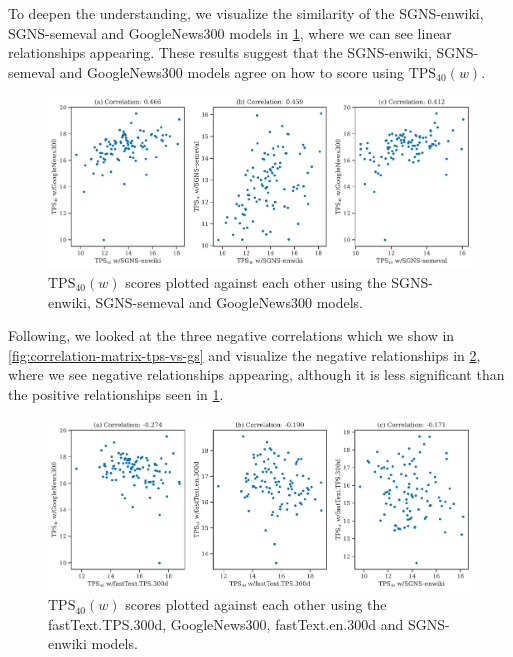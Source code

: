 To deepen the understanding, we visualize the similarity of the SGNS-enwiki, SGNS-semeval and GoogleNews300 models in \cref{fig:tps-vs-gs-top-3-correlation-word-embedding-models}, where we can see linear relationships appearing. These results suggest that the SGNS-enwiki, SGNS-semeval and GoogleNews300 models agree on how to score using $\text{TPS}_{40}(w)$.
\begin{figure}[H]
    \centering
    \includegraphics[width=\textwidth]{thesis/figures/tps-vs-gs-top-3-correlation-word-embedding-models.pdf}
    \caption{$\text{TPS}_{40}(w)$ scores plotted against each other using the SGNS-enwiki, SGNS-semeval and GoogleNews300 models.}
    \label{fig:tps-vs-gs-top-3-correlation-word-embedding-models}
\end{figure}

Following, we looked at the three negative correlations which we show in \cref{fig:correlation-matrix-tps-vs-gs} and visualize the negative relationships in \cref{fig:tps-vs-gs-top-3-negative-correlation-word-embedding-models}, where we see negative relationships appearing, although it is less significant than the positive relationships seen in \cref{fig:tps-vs-gs-top-3-correlation-word-embedding-models}.
\begin{figure}[H]
    \centering
    \includegraphics[width=\textwidth]{thesis/figures/tps-vs-gs-top-3-negative-correlation-word-embedding-models.pdf}
    \caption{$\text{TPS}_{40}(w)$ scores plotted against each other using the fastText.TPS.300d, GoogleNews300, fastText.en.300d and SGNS-enwiki models.}
    \label{fig:tps-vs-gs-top-3-negative-correlation-word-embedding-models}
\end{figure}

